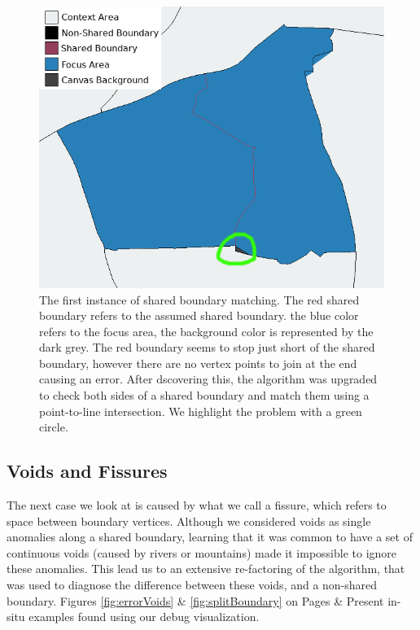 \begin{figure}
\includegraphics[width=1\textwidth]{images/ch6/WeirdBoundary3}
\caption{ The first instance of shared boundary matching. The red shared boundary refers to the assumed shared boundary. the blue color refers to the focus area, the background color is represented by the dark grey. The red boundary seems to stop just short of the shared boundary, however there are no vertex points to join at the end causing an error. After dscovering this, the algorithm was upgraded to check both sides of a shared boundary and match them using a point-to-line intersection. We highlight the problem with a green circle. }\label{fig:weirdBoundary}
\end{figure} 

\subsection{Voids and Fissures} \label{sec:complex}
The next case  we look at is caused by what we call a fissure, which refers to space between boundary vertices. Although we considered voids as single anomalies along a shared boundary, learning that it was common to have a set of continuous voids (caused by rivers or mountains) made it impossible to ignore these anomalies. This lead us to an extensive re-factoring of the algorithm, that was used to diagnose the difference between these voids, and a non-shared boundary. Figures \ref{fig:errorVoids} \& \ref{fig:splitBoundary} on Pages \pageref{fig:errorVoids} \& \pageref{fig:splitBoundary} Present in-situ examples found using our debug visualization.

